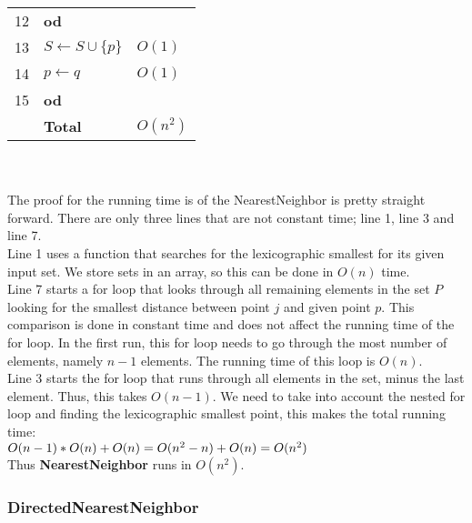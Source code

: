 \documentclass[]{article}
\begin{document}
\begin{tabular}{l l l}
      12 & \qquad \textbf{od}                                                              &           \\ 
      13 & $S \gets S \cup \{ p \}$                                                   & $O(1)$    \\ 
      14 & $p \gets q$                                                                   & $O(1)$     \\ 
      15 & \textbf{od}                                                                     & \\ \hline \hline
        &  \qquad \qquad \qquad\qquad\qquad\qquad\qquad \textbf{Total }  & $O(n^{2})$ 
     \end{tabular}
     \\ \\
     The proof for the running time is of the NearestNeighbor is pretty straight forward. There are only three lines that are not constant time; line 1, line 3 and line 7. \\
     Line 1 uses a function that searches for the lexicographic smallest for its given input set. We store sets in an array, so this can be done in $O(n)$ time.\\
     Line 7 starts a for loop that looks through all remaining elements in the set $P$ looking for the smallest distance between point $j$ and given point $p$. This comparison is done in constant time and does not affect the running time of the for loop. In the first run, this for loop needs to go through the most number of elements, namely $n-1$ elements. The running time of this loop is $O(n)$. \\
     Line 3 starts the for loop that runs through all elements in the set, minus the last element. Thus, this takes $O(n-1)$. We need to take into account the nested for loop and finding the lexicographic smallest point, this makes the total running time: \\
      $O(n-1) * O(n) + O(n) =  \\
      O(n^{2} - n ) + O(n) = \\
      O(n^{2})$ \\
  Thus \textbf{NearestNeighbor} runs in $O(n^{2})$.

  
  
  
  
  \subsubsection{DirectedNearestNeighbor} %
  \label{sub:directednearestneighbor}
    
\end{document}
